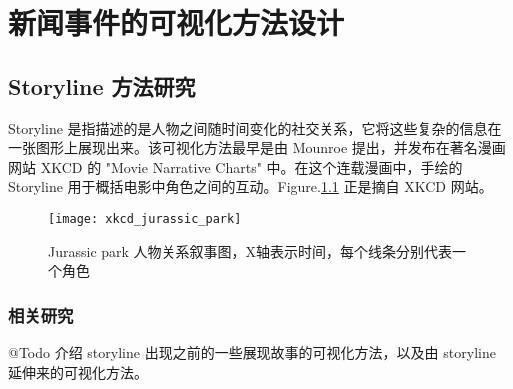 \chapter{新闻事件的可视化方法设计}

\section{Storyline 方法研究}
Storyline 是指描述的是人物之间随时间变化的社交关系，它将这些复杂的信息在一张图形上展现出来。该可视化方法最早是由 Mounroe 提出，并发布在著名漫画网站 XKCD 的 "Movie Narrative Charts" \cite{xkcd657} 中。在这个连载漫画中，手绘的 Storyline 用于概括电影中角色之间的互动。Figure.\ref{xkcd} 正是摘自 XKCD 网站。
\begin{figure}[!htb]
	\centering
		\texttt{[image: xkcd\_jurassic\_park]}
	\caption{Jurassic park 人物关系叙事图，X轴表示时间，每个线条分别代表一个角色}
	\label{xkcd}
\end{figure}


\subsection{相关研究}
@Todo 介绍 storyline 出现之前的一些展现故事的可视化方法，以及由 storyline 延伸来的可视化方法。

